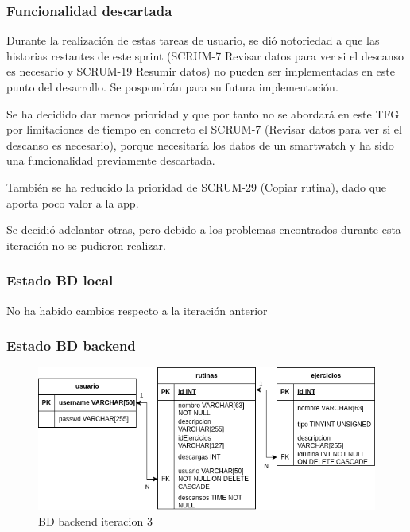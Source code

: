 
\subsubsection{Funcionalidad descartada}

Durante la realización de estas tareas de usuario, se dió notoriedad a que las historias restantes de este sprint (SCRUM-7 Revisar datos para ver si el descanso es necesario y SCRUM-19 Resumir datos) no pueden ser implementadas en este punto del desarrollo. Se pospondrán para su futura implementación.

Se ha decidido dar menos prioridad y que por tanto no se abordará en este TFG por limitaciones de tiempo en concreto el SCRUM-7 (Revisar datos para ver si el descanso es necesario), porque necesitaría los datos de un smartwatch y ha sido una funcionalidad previamente descartada.

También se ha reducido la prioridad de SCRUM-29 (Copiar rutina), dado que aporta poco valor a la app.

Se decidió adelantar otras, pero debido a los problemas encontrados durante esta iteración no se pudieron realizar.

\subsubsection{Estado BD local}

No ha habido cambios respecto a la iteración anterior

\subsubsection{Estado BD backend}

\begin{figure}[H]
   \centering
    \includegraphics[width=\textwidth]{fotos/BD be iteracion 3.png}
    \caption{BD backend iteracion 3}
    \label{fig:BD be iteracion 3}
\end{figure}


